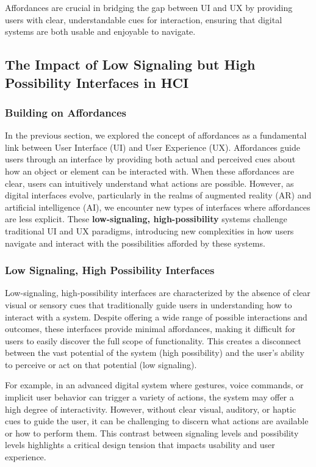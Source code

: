 Affordances are crucial in bridging the gap between UI and UX by providing users with clear, understandable cues for interaction, ensuring that digital systems are both usable and enjoyable to navigate.

\subsection{The Impact of Low Signaling but High Possibility Interfaces in HCI}

\subsubsection{Building on Affordances}

In the previous section, we explored the concept of affordances as a fundamental link between User Interface (UI) and User Experience (UX).
Affordances guide users through an interface by providing both actual and perceived cues about how an object or element can be interacted with.
When these affordances are clear, users can intuitively understand what actions are possible.
However, as digital interfaces evolve, particularly in the realms of augmented reality (AR) and artificial intelligence (AI), we encounter new types of interfaces where affordances are less explicit.
These \textbf{low-signaling, high-possibility} systems challenge traditional UI and UX paradigms, introducing new complexities in how users navigate and interact with the possibilities afforded by these systems.

\subsubsection{ Low Signaling, High Possibility Interfaces}

Low-signaling, high-possibility interfaces are characterized by the absence of clear visual or sensory cues that traditionally guide users in understanding how to interact with a system.
Despite offering a wide range of possible interactions and outcomes, these interfaces provide minimal affordances, making it difficult for users to easily discover the full scope of functionality.
This creates a disconnect between the vast potential of the system (high possibility) and the user's ability to perceive or act on that potential (low signaling).

For example, in an advanced digital system where gestures, voice commands, or implicit user behavior can trigger a variety of actions, the system may offer a high degree of interactivity.
However, without clear visual, auditory, or haptic cues to guide the user, it can be challenging to discern what actions are available or how to perform them.
This contrast between signaling levels and possibility levels highlights a critical design tension that impacts usability and user experience.

